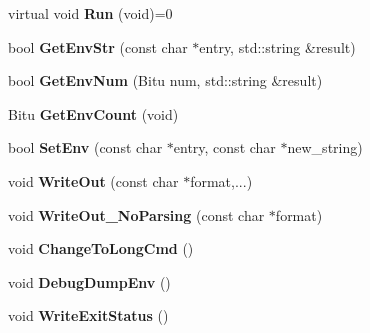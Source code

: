 \begin{DoxyCompactItemize}
\item 
\hypertarget{classProgram_acd37c94c3c12a55650a05ee1449aa176}{virtual void {\bfseries Run} (void)=0}\label{classProgram_acd37c94c3c12a55650a05ee1449aa176}

\item 
\hypertarget{classProgram_a0012adb877f24b04d836a37ab48f2c60}{bool {\bfseries Get\-Env\-Str} (const char $\ast$entry, std\-::string \&result)}\label{classProgram_a0012adb877f24b04d836a37ab48f2c60}

\item 
\hypertarget{classProgram_a58d316ec88ff44eff5188f46ef7eefd8}{bool {\bfseries Get\-Env\-Num} (Bitu num, std\-::string \&result)}\label{classProgram_a58d316ec88ff44eff5188f46ef7eefd8}

\item 
\hypertarget{classProgram_a67b647d573493de3f7237fe075a8532d}{Bitu {\bfseries Get\-Env\-Count} (void)}\label{classProgram_a67b647d573493de3f7237fe075a8532d}

\item 
\hypertarget{classProgram_a8a7d72f5c08f644fb19e5f36dc1c3d46}{bool {\bfseries Set\-Env} (const char $\ast$entry, const char $\ast$new\-\_\-string)}\label{classProgram_a8a7d72f5c08f644fb19e5f36dc1c3d46}

\item 
\hypertarget{classProgram_af3326c2431db683c8cbfcf1a4eb06f71}{void {\bfseries Write\-Out} (const char $\ast$format,...)}\label{classProgram_af3326c2431db683c8cbfcf1a4eb06f71}

\item 
\hypertarget{classProgram_aa45498c7e07ec784b72ed166ab69a847}{void {\bfseries Write\-Out\-\_\-\-No\-Parsing} (const char $\ast$format)}\label{classProgram_aa45498c7e07ec784b72ed166ab69a847}

\item 
\hypertarget{classProgram_a3b124865b50f681fa1d5ae05d71107f8}{void {\bfseries Change\-To\-Long\-Cmd} ()}\label{classProgram_a3b124865b50f681fa1d5ae05d71107f8}

\item 
\hypertarget{classProgram_a7a253f9ce31472b4b5c38791524f3ba8}{void {\bfseries Debug\-Dump\-Env} ()}\label{classProgram_a7a253f9ce31472b4b5c38791524f3ba8}

\item 
\hypertarget{classProgram_ab1fa236943ef14b02c59bc4225d216a1}{void {\bfseries Write\-Exit\-Status} ()}\label{classProgram_ab1fa236943ef14b02c59bc4225d216a1}

\end{DoxyCompactItemize}
